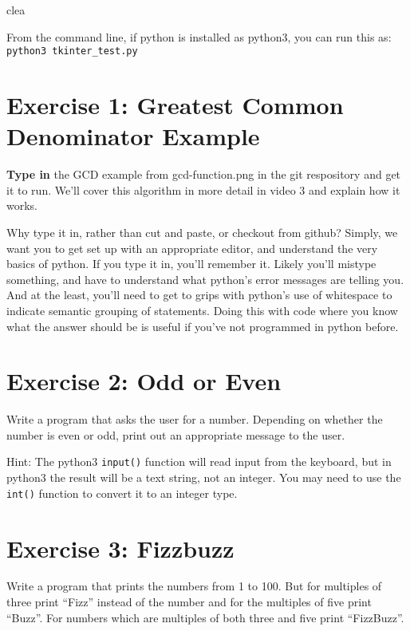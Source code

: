 clea\documentclass{article}
\begin{document}
\vspace{0.1in}\noindent From the command line, if python is installed as python3, you can run this as:\\
\texttt{python3 tkinter\_test.py}

\section*{Exercise 1: Greatest Common Denominator Example}

\textbf{Type in} the GCD example from gcd-function.png in the git
respository and get it to run.  We'll cover this algorithm in more
detail in video 3 and explain how it works.

\vspace{0.1in} Why type it in, rather than cut and paste, or checkout
from github?  Simply, we want you to get set up with an appropriate
editor, and understand the very basics of python. If you type it in,
you'll remember it.  Likely you'll mistype something, and have to
understand what python's error messages are telling you.  And at the
least, you'll need to get to grips with python's use of whitespace to
indicate semantic grouping of statements.  Doing this with code where
you know what the answer should be is useful if you've not programmed
in python before.

\section*{Exercise 2: Odd or Even}

Write a program that asks the user for a number. Depending on whether
the number is even or odd, print out an appropriate message to the
user.

\vspace{0.1in}\noindent Hint: The python3 \texttt{input()} function will read input from the keyboard,
but in python3 the result will be a text string, not an integer.  You
may need to use the \texttt{int()} function to convert it to an integer type.

\section*{Exercise 3: Fizzbuzz}

Write a program that prints the numbers from 1 to 100. But for
multiples of three print ``Fizz'' instead of the number and for the
multiples of five print ``Buzz''. For numbers which are multiples of
both three and five print ``FizzBuzz''.
\end{document}
